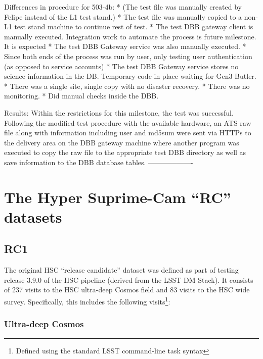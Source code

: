 \documentclass[DM,lsstdraft,STS,toc]{lsstdoc}
\begin{document}
Differences in procedure for 503-4b:
* (The test file was manually created by Felipe instead of the L1
test stand.)
* The test file was manually copied to a non-L1 test stand machine
to continue rest of test.
* The test DBB gateway client is manually executed.  Integration
work to automate the process is future milestone.  It is expected
* The test DBB Gateway service was also manually executed.
* Since both ends of the process was run by user, only testing user
authentication (as opposed to service accounts)
* The test DBB Gateway service stores no science information in the
DB.  Temporary code in place waiting for Gen3 Butler.
* There was a single site, single copy with no disaster recovery.
* There was no monitoring.
* Did manual checks inside the DBB.

Results:
Within the restrictions for this milestone, the test was successful.
Following the modified test procedure with the available hardware,
an ATS raw file along with information including user and md5sum were
sent via HTTPs to the delivery area on the DBB gateway machine where
another program was executed to copy the raw file to the appropriate
test DBB directory as well as save information to the DBB database
tables.
-------------------




\appendix

\section{The Hyper Suprime-Cam ``RC'' datasets}

\subsection{RC1}

The original HSC ``release candidate'' dataset was defined as part of testing
release 3.9.0 of the HSC pipeline (derived from the LSST DM Stack). It
consists of 237 visits to the HSC ultra-deep Cosmos field and 83 visits to the
HSC wide survey. Specifically, this includes the following
visits\footnote{Defined using the standard LSST command-line task syntax}:

\subsubsection{Ultra-deep Cosmos}
\label{sec:hscrc1}
\end{document}
